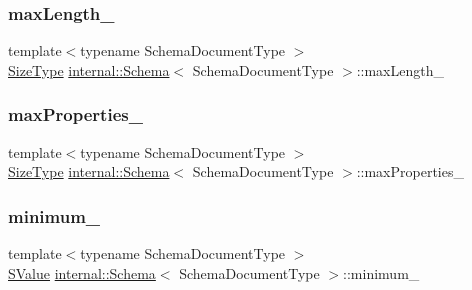 \mbox{\label{classinternal_1_1Schema_a25a018785d49a41be097b694020f603d}} 
\subsubsection{\texorpdfstring{max\+Length\+\_\+}{maxLength\_}}
{\footnotesize\ttfamily template$<$typename Schema\+Document\+Type $>$ \\
\hyperlink{rapidjson_8h_a5ed6e6e67250fadbd041127e6386dcb5}{Size\+Type} \hyperlink{classinternal_1_1Schema}{internal\+::\+Schema}$<$ Schema\+Document\+Type $>$\+::max\+Length\+\_\+\hspace{0.3cm}{\ttfamily [private]}}

\mbox{\label{classinternal_1_1Schema_a6a1a5b6f69650dc2d3766427544f8e94}} 
\subsubsection{\texorpdfstring{max\+Properties\+\_\+}{maxProperties\_}}
{\footnotesize\ttfamily template$<$typename Schema\+Document\+Type $>$ \\
\hyperlink{rapidjson_8h_a5ed6e6e67250fadbd041127e6386dcb5}{Size\+Type} \hyperlink{classinternal_1_1Schema}{internal\+::\+Schema}$<$ Schema\+Document\+Type $>$\+::max\+Properties\+\_\+\hspace{0.3cm}{\ttfamily [private]}}

\mbox{\label{classinternal_1_1Schema_a99647ee0d10cc4fcc6220d89db1fa6bc}} 
\subsubsection{\texorpdfstring{minimum\+\_\+}{minimum\_}}
{\footnotesize\ttfamily template$<$typename Schema\+Document\+Type $>$ \\
\hyperlink{classinternal_1_1Schema_ab3a07540a27d4cc2b0e260290c5c5771}{S\+Value} \hyperlink{classinternal_1_1Schema}{internal\+::\+Schema}$<$ Schema\+Document\+Type $>$\+::minimum\+\_\+\hspace{0.3cm}{\ttfamily [private]}}

